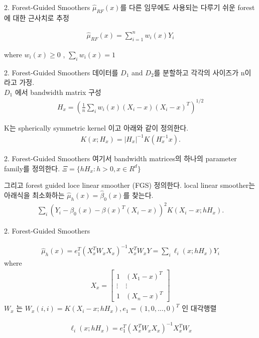 \documentclass[mathserif]{beamer}
\begin{document}
\begin{frame}{2. Forest-Guided Smoothers}
$\hat{\mu}_{RF}(x)$를 다른 임무에도 사용되는 다루기 쉬운 forest에 대한 근사치로 추정

\begin{align*}
    \hat{\mu}_{RF}(x) = \sum_{i=1}^n w_i(x)Y_i
\end{align*}

where $w_i(x) \geq 0$ , $\sum_i w_i(x)=1$
\end{frame}


\begin{frame}{2. Forest-Guided Smoothers}
데이터를 $D_1$ and $D_2$를 분할하고 각각의 사이즈가 n이라고 가정.\\
$D_1$ 에서 bandwidth matrix 구성
\begin{align}
    H_x = \left(\frac{1}{n}\sum_i w_i(x)(X_i-x)(X_i-x)^T\right)^{1/2}
\end{align}

K는 spherically symmetric kernel 이고 아래와 같이 정의한다.
\begin{align*}
    K(x;H_x)= |H_x|^{-1}K(H_x^{-1}x).
\end{align*}

\end{frame}


\begin{frame}{2. Forest-Guided Smoothers}
여기서 bandwidth matrices의 하나의 parameter family를 정의한다. $\Xi = \{hH_x : h>0, x\in R^d\}$

\vspace{5mm}

그리고 forest guided loce linear smoother (FGS) 정의한다. local linear smoother는 아래식을 최소화하는 $\hat{\mu}_h(x)=\hat{\beta}_0(x)$를 찾는다.
\begin{align*}
    \sum_i\left(Y_i-\beta_0(x)-\beta(x)^T(X_i-x)\right)^2K(X_i-x;hH_x).
\end{align*}

\end{frame}


\begin{frame}{2. Forest-Guided Smoothers}

\begin{align*}
    \hat{\mu}_h(x)=e_1^T(X_x^TW_xX_x)^{-1}X_x^TW_xY = \sum_i \ell_i(x;hH_x)Y_i
\end{align*}
where
\begin{align*}
X_x=\begin{bmatrix}
1 & (X_1-x)^T\\
\vdots & \vdots\\
1 & (X_n-x)^T
\end{bmatrix}
\end{align*}
$W_x$ 는 $W_x(i,i)=K(X_i-x;hH_x),e_1=(1,0,...,0)^T$ 인 대각행렬

\begin{align}
    \ell_i(x;hH_x) = e_1^T(X_x^TW_xX_x)^{-1}X_x^TW_x
\end{align}
\end{frame}
\end{document}
